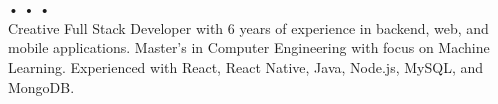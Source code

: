 \hspace*{1cm} \\ \vspace{5pt}
 \\ \vspace{5pt}
\href{tel:+1-872-258-5803}{\small{}}
\hspace{0.43em}•\hspace{0.43em}\href{mailto:ajoseph17@hawk.iit.edu}{\small{}}
\hspace{0.43em}•\hspace{0.43em}\href{https://www.linkedin.com/in/anselmj}{\small{}}
\hspace{0.43em}•\hspace{0.43em}\href{https://an23lm.github.io}{\small{}} \\ \vspace{10pt}
\small{Creative Full Stack Developer with 6 years of experience in backend, web, and mobile applications. Master's in Computer Engineering with focus on Machine Learning. Experienced with React, React Native, Java, Node.js, MySQL, and MongoDB.}
